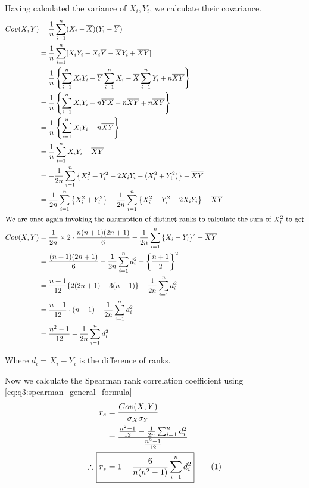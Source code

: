 \documentclass[12pt, oneside]{article}
\newcommand\numberthis{\addtocounter{equation}{1}\tag{\theequation}}
\begin{document}
\begin{enumerate}
{    Having calculated the variance of \(X_i, Y_i\), we calculate their covariance.
    \begin{align*}
        Cov(X, Y) &= \frac{1}{n} \sum_{i=1}^{n} (X_i - \overline{X}) (Y_i - \overline{Y}) \\
            &= \frac{1}{n} \sum_{i=1}^{n} [X_i Y_i - X_i \overline{Y} - \overline{X} Y_i + \overline{X} \overline{Y}] \\
            &= \frac{1}{n} \left\{ \sum_{i=1}^{n} X_i Y_i - \overline{Y} \sum_{i=1}^{n} X_i - \overline{X} \sum_{i=1}^{n} Y_i + n \overline{X} \overline{Y} \right\} \\
            &= \frac{1}{n} \left\{ \sum_{i=1}^{n} X_i Y_i - n \overline{Y} \overline{X} - n \overline{X} \overline{Y} + n \overline{X} \overline{Y} \right\} \\
            &= \frac{1}{n} \left\{ \sum_{i=1}^{n} X_i Y_i - n \overline{X} \overline{Y}\right\} \\
            &= \frac{1}{n} \sum_{i=1}^{n} X_i Y_i - \overline{X} \overline{Y} \\
            &= -\frac{1}{2n} \sum_{i=1}^{n} \left\{ X_i^2 + Y_i^2 -2 X_i Y_i - (X_i^2 + Y_i^2) \right\} - \overline{X} \overline{Y} \\
            &= \frac{1}{2n} \sum_{i=1}^{n} \left\{ X_i^2 + Y_i^2 \right\} -\frac{1}{2n} \sum_{i=1}^{n} \left\{ X_i^2 + Y_i^2 -2 X_i Y_i \right\} - \overline{X} \overline{Y} \\
            \intertext{We are once again invoking the assumption of distinct ranks to calculate the sum of \(X_i^2\) to get}
        Cov(X, Y) &= \frac{1}{2n} \times 2\cdot \frac{n(n+1)(2n+1)}{6} - \frac{1}{2n} \sum_{i=1}^{n} \left\{ X_i - Y_i \right\}^2 - \overline{X} \overline{Y} \\
            &= \frac{(n + 1)(2n + 1)}{6} - \frac{1}{2n} \sum_{i=1}^{n} d_i^2 - \left\{ \frac{n+1}{2} \right\}^2 \\
            &= \frac{n + 1}{12} \{2(2n + 1) - 3(n + 1)\} - \frac{1}{2n} \sum_{i=1}^{n} d_i^2 \\
            &= \frac{n + 1}{12} \cdot (n - 1) - \frac{1}{2n} \sum_{i=1}^{n} d_i^2 \\
            &= \frac{n^2 - 1}{12} - \frac{1}{2n} \sum_{i=1}^{n} d_i^2
    \end{align*}

    Where \(d_i = X_i - Y_i\) is the difference of ranks.

    Now we calculate the Spearman rank correlation coefficient using \eqref{eq:q3:spearman_general_formula}
    \begin{align*}
        r_s &= \frac{Cov(X, Y)}{\sigma_X \sigma_Y} \\
            &= \frac{\frac{n^2 - 1}{12} - \frac{1}{2n} \sum_{i=1}^{n} d_i^2}{ \frac{n^2 - 1}{12} } \\
        \therefore~ \Aboxed{r_s  &= 1 - \frac{6}{n(n^2 - 1)} \sum_{i=1}^{n} d_i^2}
            \numberthis \label{eq:q3:spearman_distinct_formula}
    \end{align*}

}
\end{enumerate}
\end{document}
